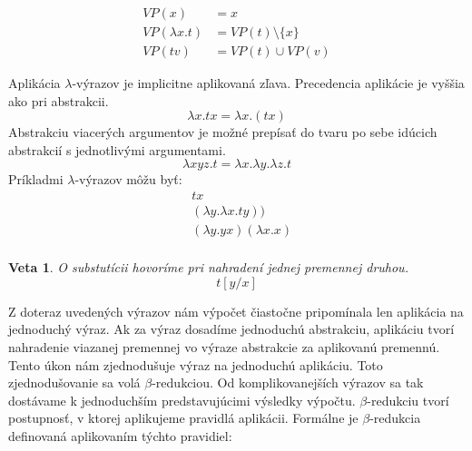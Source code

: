\documentclass[a4paper,10pt,oneside]{report}%
\newtheorem{theorem}{Veta}[chapter]
\begin{document}
\begin{center}
    \begin{align*}
        VP(x) &= {x} \\
        VP(\lambda x.t) &= VP(t)  \setminus \{x\} \\
        VP(t v) &= VP(t) \cup VP(v)
    \end{align*}
\end{center}
    Aplikácia $\lambda$-výrazov je implicitne aplikovaná zľava.
    Precedencia aplikácie je vyššia ako pri abstrakcii.
\begin{equation*}
    \lambda x . t x = \lambda x . (t x)
\end{equation*}
    Abstrakciu viacerých argumentov je možné prepísať do tvaru po sebe idúcich
abstrakcií s jednotlivými argumentami.
\begin{equation*}
    \lambda x y z . t = \lambda x . \lambda y . \lambda z . t
\end{equation*}
    Príkladmi $\lambda$-výrazov môžu byť:
\begin{align*}
    & t x                             \\
    & (\lambda y . \lambda x . t y )) \\
    & (\lambda y.y x) (\lambda x . x) \\
\end{align*}
\begin{theorem}
    O substutícii hovoríme pri nahradení jednej premennej druhou.
    \begin{equation}
        t [ y / x ]
    \end{equation}
\end{theorem}

    Z doteraz uvedených výrazov nám výpočet čiastočne pripomínala len aplikácia na
jednoduchý výraz.
    Ak za výraz dosadíme jednoduchú abstrakciu, aplikáciu tvorí nahradenie
viazanej premennej vo výraze abstrakcie za aplikovanú premennú.
    Tento úkon nám zjednodušuje výraz na jednoduchú aplikáciu.
    Toto zjednodušovanie sa volá $\beta$-redukciou.
    Od komplikovanejších výrazov sa tak dostávame k jednoduchším predstavujúcimi
výsledky výpočtu.
    $\beta$-redukciu tvorí postupnosť, v ktorej aplikujeme pravidlá
aplikácii.
    Formálne je $\beta$-redukcia definovaná aplikovaním týchto pravidiel:

~\\
\end{document}
